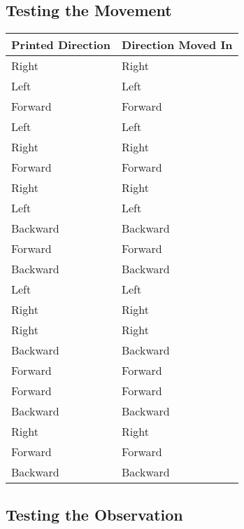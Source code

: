 			\subsection{Testing the Movement}
			\begin{table}[h!]
				\centering
				\begin{tabular}{|| l | l ||} 
					\hline
					Printed Direction & Direction Moved In &  \\ [0.5ex] 
					\hline
					Right & Right &  \\
					Left & Left &  \\ 
					Forward & Forward &  \\ 
					Left & Left &  \\ 
					Right & Right &  \\ 
					Forward & Forward &  \\ 
					Right & Right &  \\ 
					Left & Left &  \\ 
					Backward & Backward &  \\ 
					Forward & Forward &  \\ 
					Backward & Backward &  \\ 
					Left & Left &  \\ 
					Right & Right &  \\ 
					Right & Right &  \\ 
					Backward & Backward &  \\ 
					Forward & Forward &  \\ 
					Forward & Forward &  \\ 
					Backward & Backward &  \\ 
					Right & Right &  \\ 
					Forward & Forward &  \\ 
					Backward & Backward &  \\ [1ex] 
					\hline
				\end{tabular}
				\label{table:movementtests}		
			\end{table}
		
		\subsection{Testing the Observation}
		

